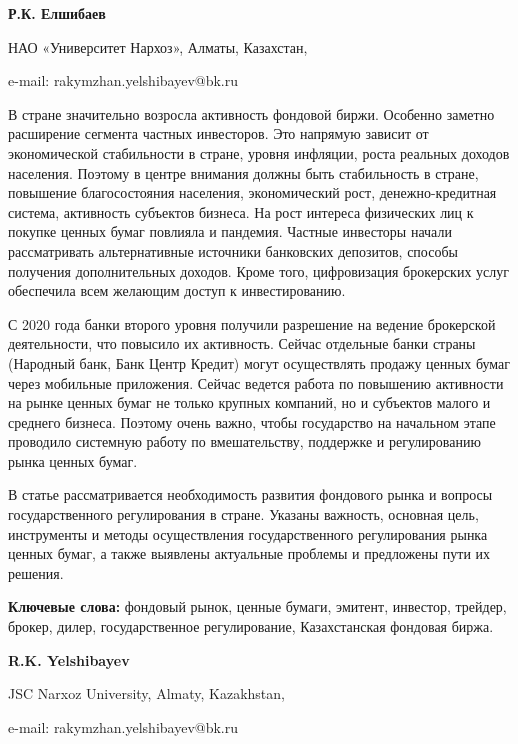 
\begin{center}
{\bfseries Р.К. Елшибаев}

НАО «Университет Нархоз», Алматы, Казахстан,

e-mail: rakymzhan.yelshibayev@bk.ru
\end{center}

В стране значительно возросла активность фондовой биржи. Особенно
заметно расширение сегмента частных инвесторов. Это напрямую зависит от
экономической стабильности в стране, уровня инфляции, роста реальных
доходов населения. Поэтому в центре внимания должны быть стабильность в
стране, повышение благосостояния населения, экономический рост,
денежно-кредитная система, активность субъектов бизнеса. На рост
интереса физических лиц к покупке ценных бумаг повлияла и пандемия.
Частные инвесторы начали рассматривать альтернативные источники
банковских депозитов, способы получения дополнительных доходов. Кроме
того, цифровизация брокерских услуг обеспечила всем желающим доступ к
инвестированию.

С 2020 года банки второго уровня получили разрешение на ведение
брокерской деятельности, что повысило их активность. Сейчас отдельные
банки страны (Народный банк, Банк Центр Кредит) могут осуществлять
продажу ценных бумаг через мобильные приложения. Сейчас ведется работа
по повышению активности на рынке ценных бумаг не только крупных
компаний, но и субъектов малого и среднего бизнеса. Поэтому очень важно,
чтобы государство на начальном этапе проводило системную работу по
вмешательству, поддержке и регулированию рынка ценных бумаг.

В статье рассматривается необходимость развития фондового рынка и
вопросы государственного регулирования в стране. Указаны важность,
основная цель, инструменты и методы осуществления государственного
регулирования рынка ценных бумаг, а также выявлены актуальные проблемы и
предложены пути их решения.

{\bfseries Ключевые слова:} фондовый рынок, ценные бумаги, эмитент,
инвестор, трейдер, брокер, дилер, государственное регулирование,
Казахстанская фондовая биржа.


\begin{center}
{\bfseries R.K. Yelshibayev}

JSC Narxoz University, Almaty, Kazakhstan,

e-mail: rakymzhan.yelshibayev@bk.ru
\end{center}

